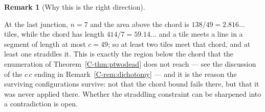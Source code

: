 \documentclass[11pt,reqno]{amsart}
\theoremstyle{plain}
\theoremstyle{definition}
\newtheorem{remark}[theorem]{Remark}
\begin{document}
\begin{remark}[Why this is the right direction]\label{O-straddlescope}

At the last junction, $n=7$ and the area above the chord is $138/49=2.816\ldots$ tiles, while the
chord has length $414/7=59.14\ldots$ and a tile meets a line in a segment of length at most $c=49$;
so at least two tiles meet that chord, and at least one straddles it. This is exactly the region
below the chord that the enumeration of Theorem~\ref{C-thm:ptwodead} does not reach --- see the
discussion of the $c\,c$ ending in Remark~\ref{C-rem:dichotomy} --- and it is the reason the surviving
configurations survive: not that the chord bound fails there, but that it was never applied there.
Whether the straddling constraint can be sharpened into a contradiction is open.
\end{remark}
\end{document}
